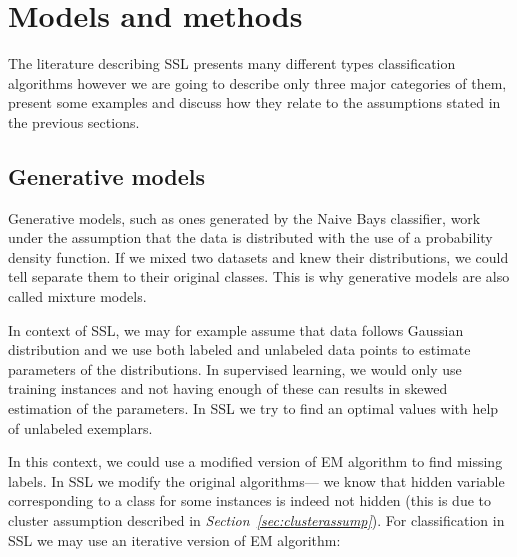 \documentclass[12pt, a4paper, pdflatex]{report}
\begin{document}
\section{Models and methods}

The literature describing SSL presents many different types classification algorithms\cite{chapelle06,Zhu06semi} however we are going to describe only three major categories of them, present some examples and discuss how they relate to the assumptions stated in the previous sections.

\subsection{Generative models}

Generative models, such as ones generated by the Naive Bays classifier, work under the assumption that the data is distributed with the use of a probability density function. If we mixed two datasets and knew their distributions, we could tell separate them to their original classes. This is why generative models are also called mixture models\cite{Zhu06semi}.

In context of SSL, we may for example assume that data follows Gaussian distribution and we use both labeled and unlabeled data points to estimate parameters of the distributions. In supervised learning, we would only use training instances and not having enough of these can results in skewed estimation of the parameters. In SSL we try to find an optimal values with help of unlabeled exemplars.

In this context, we could use a modified version of EM algorithm to find missing labels. In SSL we modify the original algorithms--- we know that hidden variable corresponding to a class for some instances is indeed not hidden (this is due to cluster assumption described in \emph{Section~\ref{sec:clusterassump}})\cite{Zhu06semi, chapelle06}. For classification in SSL we may use an iterative version of EM algorithm:\\[1cm]
\end{document}
